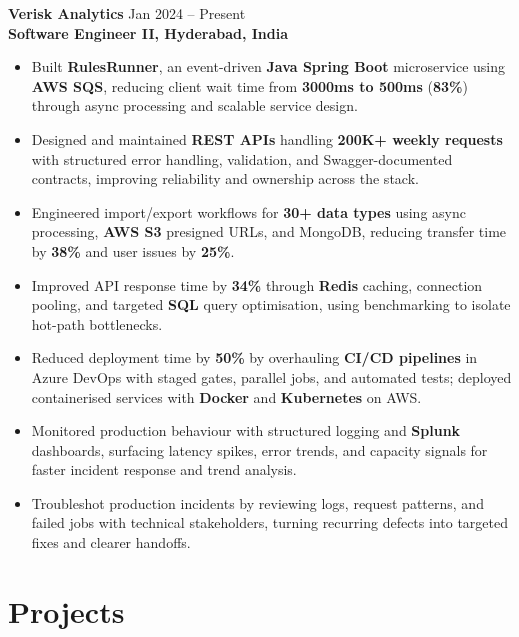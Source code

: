 \documentclass[10pt,letterpaper]{article}
\begin{document}
\textbf{Verisk Analytics} \hfill Jan 2024 -- Present \\
\textbf{Software Engineer II, Hyderabad, India}
\begin{itemize}[leftmargin=*]
    \item Built \textbf{RulesRunner}, an event-driven \textbf{Java Spring Boot} microservice using \textbf{AWS SQS}, reducing client wait time from \textbf{3000ms to 500ms} (\textbf{83\%}) through async processing and scalable service design.
    \item Designed and maintained \textbf{REST APIs} handling \textbf{200K+ weekly requests} with structured error handling, validation, and Swagger-documented contracts, improving reliability and ownership across the stack.
    \item Engineered import/export workflows for \textbf{30+ data types} using async processing, \textbf{AWS S3} presigned URLs, and MongoDB, reducing transfer time by \textbf{38\%} and user issues by \textbf{25\%}.
    \item Improved API response time by \textbf{34\%} through \textbf{Redis} caching, connection pooling, and targeted \textbf{SQL} query optimisation, using benchmarking to isolate hot-path bottlenecks.
    \item Reduced deployment time by \textbf{50\%} by overhauling \textbf{CI/CD pipelines} in Azure DevOps with staged gates, parallel jobs, and automated tests; deployed containerised services with \textbf{Docker} and \textbf{Kubernetes} on AWS.
    \item Monitored production behaviour with structured logging and \textbf{Splunk} dashboards, surfacing latency spikes, error trends, and capacity signals for faster incident response and trend analysis.
    \item Troubleshot production incidents by reviewing logs, request patterns, and failed jobs with technical stakeholders, turning recurring defects into targeted fixes and clearer handoffs.
\end{itemize}

\section*{Projects}
\end{document}
